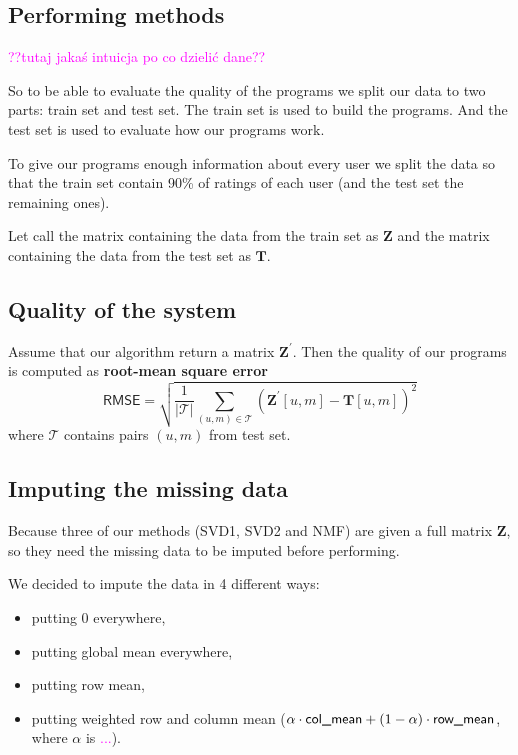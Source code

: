\documentclass[11pt]{amsart}
\newcommand{\tami}[1]{{\textcolor{magenta}{#1}}}
\begin{document}
\subsection*{Performing methods}

\tami{??tutaj jakaś intuicja po co dzielić dane??}

So to be able to evaluate the quality of the programs we split our data to two parts: train set and test set.
The train set is used to build the programs.
And the test set is used to evaluate how our programs work.


To give our programs enough information about every user we split the data so that the train set contain 90\% of ratings of each user (and the test set the remaining ones).


Let call the matrix containing the data from the train set as $\boldsymbol{Z}$ and the matrix containing the data from the test set as $\boldsymbol{T}$.


\subsection*{Quality of the system}

Assume that our algorithm return a matrix $\boldsymbol{Z}^{'}$.
Then the quality of our programs is computed as \textbf{root-mean square error}
\[\textsf{RMSE} =
\sqrt{\frac{1}{|\mathcal{T}|} \sum_{(u,m) \in \mathcal{T}} \left(\boldsymbol{Z}^{'}[u,m] - \boldsymbol{T}[u,m] \right)^2}\]
where $\mathcal{T}$ contains pairs $(u,m)$ from test set.


\subsection*{Imputing the missing data}

Because three of our methods (SVD1, SVD2 and NMF) are given a full matrix $\boldsymbol{Z}$, so they need the missing data to be imputed before performing.

We decided to impute the data in 4 different ways:
\begin{itemize}
    \item putting 0 everywhere,
    \item putting global mean everywhere,
    \item putting row mean,
    \item putting weighted row and column mean ($\alpha \cdot \text{\textsf{col\_mean}} + (1-\alpha) \cdot \text{\textsf{row\_mean}}$, where $\alpha$ is \tami{...}).
\end{itemize}
\end{document}
